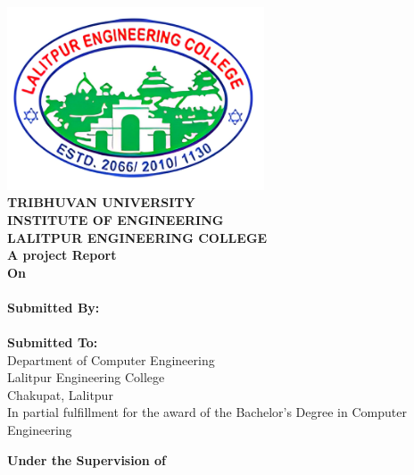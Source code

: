 \begin{center}
    \linespread{1.6}
    \thispagestyle{empty}
    \includegraphics[width= 3in ]{img/leclogo21.png} \\
    \vspace{0.05 in}
    {\fontsize{12 pt}{12} \selectfont\textbf{TRIBHUVAN UNIVERSITY} \\
        \textbf{INSTITUTE OF ENGINEERING} \\
        \textbf{LALITPUR ENGINEERING COLLEGE}} \\

    \vspace{0.4 in}
    \textbf{A project Report}\\
    {\fontsize{12 pt}{12} \selectfont\textbf{On}\\}
    {\fontsize{12 pt}{12} \selectfont \textbf{\thetitle}}\\
    \vspace{0.4in}
    \textbf{ Submitted By:}  \\
    {\theauthor} \\
    \vspace{0.3 in}
    \textbf{ Submitted To:}  \\
    Department of Computer Engineering \\
    Lalitpur Engineering College \\
    Chakupat, Lalitpur \\

    \vspace{0.3in}
    In partial fulfillment for the award of the
    Bachelor's Degree in Computer Engineering

    \vspace{0.2in}
    \textbf{Under the Supervision of} \\
    \thesupervisor\\
    \vspace{0.2in}
    \thedate

\end{center}
